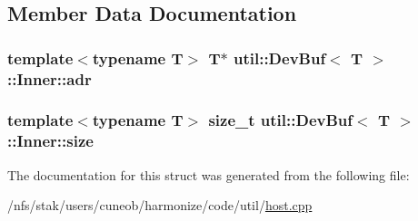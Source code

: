 \subsection{Member Data Documentation}
\hypertarget{structutil_1_1DevBuf_1_1Inner_a1c24c5bda44e956ec0a3a2bc183e2b28}{
\subsubsection[{adr}]{\setlength{\rightskip}{0pt plus 5cm}template$<$typename T$>$ T$\ast$ {\bf util\-::\-Dev\-Buf}$<$ T $>$\-::Inner\-::adr}}\label{structutil_1_1DevBuf_1_1Inner_a1c24c5bda44e956ec0a3a2bc183e2b28}
\hypertarget{structutil_1_1DevBuf_1_1Inner_a49b646d5712c68a37e2ec40f7c309616}{
\subsubsection[{size}]{\setlength{\rightskip}{0pt plus 5cm}template$<$typename T$>$ size\-\_\-t {\bf util\-::\-Dev\-Buf}$<$ T $>$\-::Inner\-::size}}\label{structutil_1_1DevBuf_1_1Inner_a49b646d5712c68a37e2ec40f7c309616}


The documentation for this struct was generated from the following file\-:\begin{DoxyCompactItemize}
\item 
/nfs/stak/users/cuneob/harmonize/code/util/\hyperlink{host_8cpp}{host.\-cpp}\end{DoxyCompactItemize}
